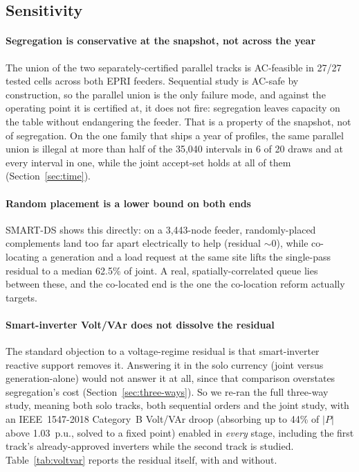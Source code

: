 \documentclass[review,authoryear,12pt]{elsarticle}
\begin{document}
\subsection{Sensitivity}
\label{sec:robustness}

\paragraph{Segregation is conservative at the snapshot, not across the year}
The union of the two separately-certified parallel tracks is AC-feasible in
27/27 tested cells across both EPRI feeders. Sequential study is AC-safe by
construction, so the parallel union is the only failure mode, and against the
operating point it is certified at, it does not fire: segregation leaves
capacity on the table without endangering the feeder. That is a property of
the snapshot, not of segregation. On the one family that ships a year of
profiles, the same parallel union is illegal at more than half of the 35{,}040
intervals in 6 of 20 draws and at every interval in one, while the joint
accept-set holds at all of them (Section~\ref{sec:time}).

\paragraph{Random placement is a lower bound on both ends}
SMART-DS shows this directly: on a 3{,}443-node feeder, randomly-placed
complements land too far apart electrically to help (residual $\sim$0), while
co-locating a generation and a load request at the same site lifts the
single-pass residual to a median 62.5\% of joint. A real, spatially-correlated
queue lies between
these, and the co-located end is the one the co-location reform actually
targets.

\paragraph{Smart-inverter Volt/VAr does not dissolve the residual}
The standard objection to a voltage-regime residual is that smart-inverter
reactive support removes it. Answering it in the solo currency (joint versus
generation-alone) would not answer it at all, since that comparison overstates
segregation's cost (Section~\ref{sec:three-ways}). So we re-ran the full
three-way study, meaning both solo tracks, both sequential orders and the joint
study, with an IEEE~1547-2018 Category~B Volt/VAr droop
(absorbing up to 44\% of $|P|$ above 1.03~p.u., solved to a fixed point)
enabled in \emph{every} stage, including the first track's already-approved
inverters while the second track is studied. Table~\ref{tab:voltvar} reports
the residual itself, with and without.
\end{document}
